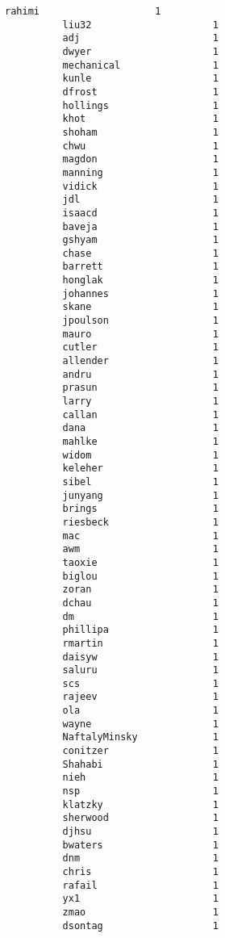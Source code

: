 \documentclass[11pt]{article}
\begin{document}
\begin{Verbatim}[commandchars=\\\{\}]
          rahimi                    1
          liu32                     1
          adj                       1
          dwyer                     1
          mechanical                1
          kunle                     1
          dfrost                    1
          hollings                  1
          khot                      1
          shoham                    1
          chwu                      1
          magdon                    1
          manning                   1
          vidick                    1
          jdl                       1
          isaacd                    1
          baveja                    1
          gshyam                    1
          chase                     1
          barrett                   1
          honglak                   1
          johannes                  1
          skane                     1
          jpoulson                  1
          mauro                     1
          cutler                    1
          allender                  1
          andru                     1
          prasun                    1
          larry                     1
          callan                    1
          dana                      1
          mahlke                    1
          widom                     1
          keleher                   1
          sibel                     1
          junyang                   1
          brings                    1
          riesbeck                  1
          mac                       1
          awm                       1
          taoxie                    1
          biglou                    1
          zoran                     1
          dchau                     1
          dm                        1
          phillipa                  1
          rmartin                   1
          daisyw                    1
          saluru                    1
          scs                       1
          rajeev                    1
          ola                       1
          wayne                     1
          NaftalyMinsky             1
          conitzer                  1
          Shahabi                   1
          nieh                      1
          nsp                       1
          klatzky                   1
          sherwood                  1
          djhsu                     1
          bwaters                   1
          dnm                       1
          chris                     1
          rafail                    1
          yx1                       1
          zmao                      1
          dsontag                   1

\end{Verbatim}
\end{document}
